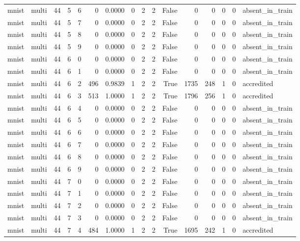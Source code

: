 \begin{tabular}{llrrrrrrrrrrrrrl}
mnist & multi & 44 & 5 & 6 & 0 & 0.0000 & 0 & 2 & 2 & False & 0 & 0 & 0 & 0 & absent\_in\_train \\
mnist & multi & 44 & 5 & 7 & 0 & 0.0000 & 0 & 2 & 2 & False & 0 & 0 & 0 & 0 & absent\_in\_train \\
mnist & multi & 44 & 5 & 8 & 0 & 0.0000 & 0 & 2 & 2 & False & 0 & 0 & 0 & 0 & absent\_in\_train \\
mnist & multi & 44 & 5 & 9 & 0 & 0.0000 & 0 & 2 & 2 & False & 0 & 0 & 0 & 0 & absent\_in\_train \\
mnist & multi & 44 & 6 & 0 & 0 & 0.0000 & 0 & 2 & 2 & False & 0 & 0 & 0 & 0 & absent\_in\_train \\
mnist & multi & 44 & 6 & 1 & 0 & 0.0000 & 0 & 2 & 2 & False & 0 & 0 & 0 & 0 & absent\_in\_train \\
mnist & multi & 44 & 6 & 2 & 496 & 0.9839 & 1 & 2 & 2 & True & 1735 & 248 & 1 & 0 & accredited \\
mnist & multi & 44 & 6 & 3 & 513 & 1.0000 & 1 & 2 & 2 & True & 1796 & 256 & 1 & 0 & accredited \\
mnist & multi & 44 & 6 & 4 & 0 & 0.0000 & 0 & 2 & 2 & False & 0 & 0 & 0 & 0 & absent\_in\_train \\
mnist & multi & 44 & 6 & 5 & 0 & 0.0000 & 0 & 2 & 2 & False & 0 & 0 & 0 & 0 & absent\_in\_train \\
mnist & multi & 44 & 6 & 6 & 0 & 0.0000 & 0 & 2 & 2 & False & 0 & 0 & 0 & 0 & absent\_in\_train \\
mnist & multi & 44 & 6 & 7 & 0 & 0.0000 & 0 & 2 & 2 & False & 0 & 0 & 0 & 0 & absent\_in\_train \\
mnist & multi & 44 & 6 & 8 & 0 & 0.0000 & 0 & 2 & 2 & False & 0 & 0 & 0 & 0 & absent\_in\_train \\
mnist & multi & 44 & 6 & 9 & 0 & 0.0000 & 0 & 2 & 2 & False & 0 & 0 & 0 & 0 & absent\_in\_train \\
mnist & multi & 44 & 7 & 0 & 0 & 0.0000 & 0 & 2 & 2 & False & 0 & 0 & 0 & 0 & absent\_in\_train \\
mnist & multi & 44 & 7 & 1 & 0 & 0.0000 & 0 & 2 & 2 & False & 0 & 0 & 0 & 0 & absent\_in\_train \\
mnist & multi & 44 & 7 & 2 & 0 & 0.0000 & 0 & 2 & 2 & False & 0 & 0 & 0 & 0 & absent\_in\_train \\
mnist & multi & 44 & 7 & 3 & 0 & 0.0000 & 0 & 2 & 2 & False & 0 & 0 & 0 & 0 & absent\_in\_train \\
mnist & multi & 44 & 7 & 4 & 484 & 1.0000 & 1 & 2 & 2 & True & 1695 & 242 & 1 & 0 & accredited \\

\end{tabular}

